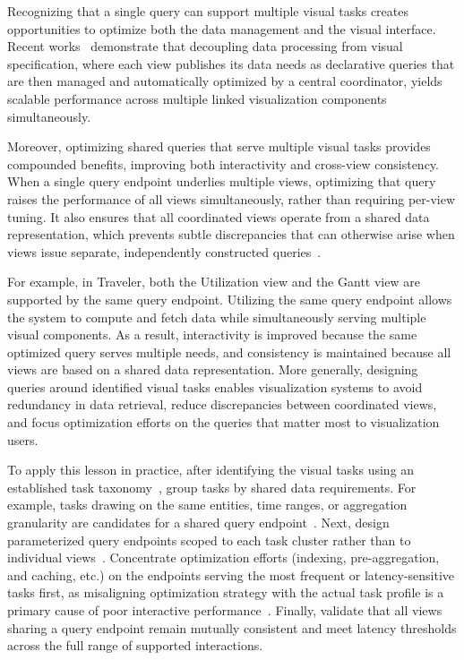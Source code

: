 \begin{refsection}
Recognizing that a single query can support multiple visual tasks creates opportunities to optimize both the data management and the visual interface. Recent works~\cite{heer2023mosaic, yang2024optimizing, vieth2023manivault} demonstrate that decoupling data processing from visual specification, where each view publishes its data needs as declarative queries that are then managed and automatically optimized by a central coordinator, yields scalable performance across multiple linked visualization components simultaneously.

Moreover, optimizing shared queries that serve multiple visual tasks provides compounded benefits, improving both interactivity and cross-view consistency. When a single query endpoint underlies multiple views, optimizing that query raises the performance of all views simultaneously, rather than requiring per-view tuning. It also ensures that all coordinated views operate from a shared data representation, which prevents subtle discrepancies that can otherwise arise when views issue separate, independently constructed queries~\cite{battle2020structured, vieth2023manivault}.

For example, in Traveler, both the Utilization view and the Gantt view are supported by the same query endpoint. Utilizing the same query endpoint allows the system to compute and fetch data while simultaneously serving multiple visual components. As a result, interactivity is improved because the same optimized query serves multiple needs, and consistency is maintained because all views are based on a shared data representation. More generally, designing queries around identified visual tasks enables visualization systems to avoid redundancy in data retrieval, reduce discrepancies between coordinated views, and focus optimization efforts on the queries that matter most to visualization users.

To apply this lesson in practice, after identifying the visual tasks using an established task taxonomy~\cite{brehmer2013multi, zinat2024multi}, group tasks by shared data requirements. For example, tasks drawing on the same entities, time ranges, or aggregation granularity are candidates for a shared query endpoint~\cite{heer2023mosaic, battle2020structured}. Next, design parameterized query endpoints scoped to each task cluster rather than to individual views~\cite{moritz2019falcon, heer2023mosaic}. Concentrate optimization efforts (indexing, pre-aggregation, and caching, etc.) on the endpoints serving the most frequent or latency-sensitive tasks first, as misaligning optimization strategy with the actual task profile is a primary cause of poor interactive performance~\cite{battle2020structured, moritz2019falcon}. Finally, validate that all views sharing a query endpoint remain mutually consistent and meet latency thresholds across the full range of supported interactions.


\end{refsection}
